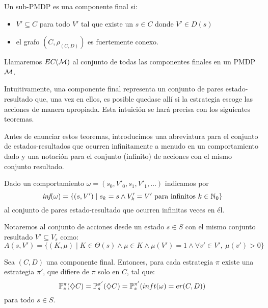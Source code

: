 \begin{definition} \label{defEC}
	Un sub-PMDP es una componente final si:

	\begin{itemize}
		\item $V' \subseteq C$ para todo $V'$ tal que existe un $s \in C$ donde $V' \in D(s)$

		\item el grafo $(C, \rho_{(C,D)})$ es fuertemente conexo.
	\end{itemize}

	Llamaremos $EC(\mathcal{M})$ al conjunto de todas las componentes finales en un PMDP
	$\mathcal{M}$.
\end{definition}

Intuitivamente, una componente final representa un conjunto de pares
estado-resultado que, una vez en ellos, es posible quedase allí si la
estrategia escoge las acciones de manera apropiada. Esta intuición se hará
precisa con los siguientes teoremas.

Antes de enunciar estos teoremas, introducimos una abreviatura para el conjunto
de estados-resultados que ocurren infinitamente a menudo en un comportamiento
dado y una notación para el conjunto (infinito) de acciones con el mismo
conjunto resultado.

\begin{definition}[$\inft$]
	Dado un comportamiento $\omega = (s_0, V'_0, s_1, V'_1, \dots)$ indicamos por
	\[
		\textit{inf} (\omega) = \{(s, V') \mid s_k = s \wedge V'_k = V' \text{ para infinitos } k \in \mathbb{N}_0\}
	\]
	al conjunto de pares estado-resultado que ocurren infinitas veces en él.
\end{definition}

\begin{definition}[A(s, V')]
	Notaremos al conjunto de acciones desde un estado $s \in S$ con el mismo conjunto resultado $V' \subseteq V_s$ como:
	$$A(s, V') = \{(K, \mu) \mid K \in \Theta(s) \wedge \mu \in K \wedge \mu(V') = 1 \wedge \forall v' \in V', \ \mu(v') > 0\}$$
\end{definition}

\begin{theorem}
	\label{teoEstabilidadEC}
	Sea $(C, D)$ una componente final. Entonces, para cada estrategia $\pi$ existe una estrategia $\pi'$, que difiere de $\pi$ solo en $C$, tal que:
	\begin{equation} \label{estabEC}
		\mathbb{P}^\pi_s(\diamondsuit C) = \mathbb{P}^{\pi'}_s(\diamondsuit C) = \mathbb{P}^{\pi'}_s(inft(\omega) = er(C,D))
	\end{equation}
	para todo $s \in S$.
\end{theorem}

